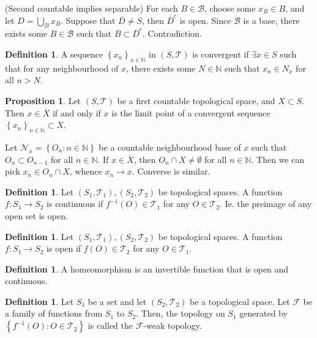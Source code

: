 \documentclass[11pt]{article}
\theoremstyle{definition}
\newtheorem{defn}[thm]{Definition}
\newtheorem{prop}[thm]{Proposition}
\newcommand{\set}[1]{\left\{ #1 \right\}}
\newcommand{\NN}{\mathbb{N}}
\newcommand{\m}[1]{\mathcal{#1}}
\begin{document}
(Second countable implies separable)
For each $B\in\m{B}$, choose some $x_B\in B$, and let $D=\bigcup_B x_B$. Suppose that
$\overline{D}\neq S$, then $\overline{D}^c$ is open. Since $\m{B}$ is a base, there exists
some $B\in\m{B}$ such that $B\subset\overline{D}^c$. Contradiction.
\qedhere

\begin{defn}
A sequence $\set{x_n}_{x\in\NN}$ in $(S,\m{T})$ is convergent if $\exists x\in S$ such that
for any neighbourhood of $x$, there exists some $N\in\NN$ such that $x_n\in N_x$ for all
$n>N$.
\end{defn}



\begin{prop}
Let $(S,\m{T})$ be a first countable topological space, and $X\subset S$. Then
$x\in\overline{X}$ if and only if $x$ is the limit point of a convergent sequence
$\set{x_n}_{n\in\NN}\subset X$.
\end{prop}
\proof
Let $\m{N}_x=\set{O_n:n\in\NN}$ be a countable neighbourhood base of $x$ such that
$O_n\subset O_{n-1}$ for all $n\in\NN$. If $x\in\overline{X}$, then $O_n\cap
X\neq\emptyset$ for all $n\in\NN$. Then we can pick $x_n\in O_n\cap X$, whence $x_n\to x$.
Converse is similar.
\qedhere

\begin{defn}
Let $(S_1,\m{T}_1), (S_2,\m{T}_2)$ be topological spaces. A function $f:S_1\to S_2$ is
continuous if $f^{-1}(O)\in\m{T}_1$ for any $O\in\m{T}_2$. Ie. the preimage of any open set
is open.
\end{defn}

\begin{defn}
Let $(S_1,\m{T}_1), (S_2,\m{T}_2)$ be topological spaces. A function $f:S_1\to S_2$ is open
if $f(O)\in\m{T}_2$ for any $O\in\m{T}_1$.
\end{defn}

\begin{defn}
A homeomorphism is an invertible function that is open and continuous.
\end{defn}

\begin{defn}
Let $S_1$ be a set and let $(S_2,\m{T}_2)$ be a topological space. Let $\m{F}$ be a family
of functions from $S_1$ to $S_2$. Then, the topology on $S_1$ generated by
$\set{f^{-1}(O):O\in\m{T}_2}$ is called the $\m{F}$-weak topology.
\end{defn}
\end{document}
